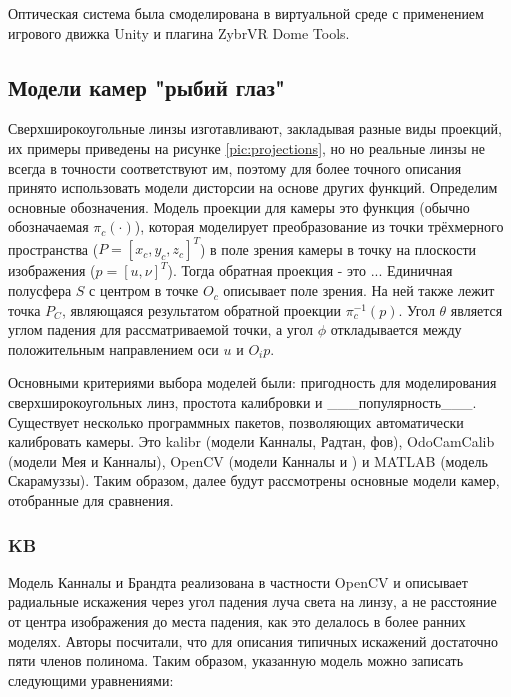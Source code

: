 Оптическая система была смоделирована в виртуальной среде с применением игрового движка Unity и плагина ZybrVR Dome Tools. %

\subsection{Модели камер "рыбий глаз"}

Сверхширокоугольные линзы изготавливают, закладывая разные виды проекций, их примеры приведены на рисунке \ref{pic:projections}, но 
но реальные линзы не всегда в точности соответствуют им, поэтому для более точного описания принято использовать модели дисторсии
 на основе других функций.
Определим основные обозначения. Модель проекции для камеры это функция (обычно обозначаемая $\pi_c(\cdot )$), которая моделирует преобразование 
из точки трёхмерного пространства ($P=[x_c, y_c, z_c]^T$) в поле зрения камеры в точку на плоскости изображения ($p=[u, \nu]^T$). Тогда обратная
проекция - это ... Единичная            %
полусфера $S$ с центром в точке $O_c$ описывает поле зрения. На ней также лежит точка $P_C$, являющаяся результатом обратной проекции $\pi^{-1}_c({p})$.
Угол $\theta$ является углом падения для рассматриваемой точки, а угол $\phi$ откладывается между положительным направлением оси $u$ и $O_{i}{p}$. 

Основными критериями выбора моделей были: пригодность для моделирования 
сверхширокоугольных линз, простота калибровки и ___популярность___. Существует несколько программных пакетов, позволяющих автоматически калибровать камеры. 
Это kalibr (модели Канналы, Радтан, фов), OdoCamCalib (модели Мея и Канналы), OpenCV (модели Канналы и ) и MATLAB (модель Скарамуззы). Таким образом, далее 
будут рассмотрены основные модели камер, отобранные для сравнения. 

\subsubsection{KB}

Модель Канналы и 
Брандта \cite{opencv_model} реализована в частности OpenCV и описывает радиальные искажения через угол падения луча света на линзу, а не расстояние  
от центра изображения до места падения, как это делалось в более ранних моделях. Авторы посчитали, что для описания типичных искажений достаточно 
пяти членов полинома. Таким образом, указанную модель можно записать следующими уравнениями:

